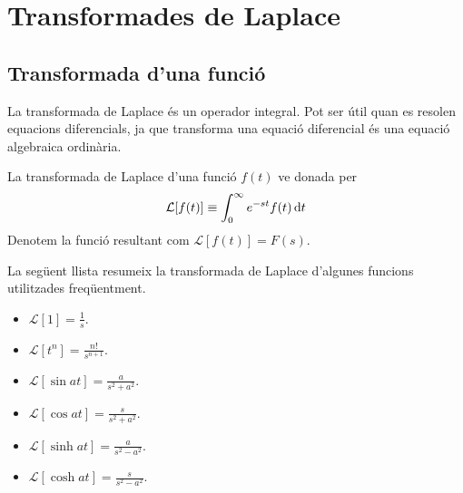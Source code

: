 \section{Transformades de Laplace}
\subsection{Transformada d'una funció}
La transformada de Laplace és un operador integral. Pot ser útil quan es resolen equacions diferencials, ja que transforma una equació diferencial és una equació algebraica ordinària.
\begin{defi}
    La transformada de Laplace d'una funció $f(t)$ ve donada per
    \begin{align}
        \mathcal{L}[f(t)] \equiv \int_{0}^{\infty} e^{-st} f(t) \mathop{}\!\mathrm{d} t
    \end{align}
    Denotem la funció resultant com $\mathcal{L}[f(t)] = F(s)$.
\end{defi}
La següent llista resumeix la transformada de Laplace d'algunes funcions utilitzades freqüentment.
\begin{itemize}
    \item $\mathcal{L}[1] = \displaystyle \frac{1}{s}$.
    \item $\mathcal{L}[t^{n}] = \displaystyle \frac{n!}{s^{n+1}}$.
    \item $\mathcal{L}[\sin at] = \displaystyle \frac{a}{s^2 + a^2}$.
    \item $\mathcal{L}[\cos at] = \displaystyle \frac{s}{s^2 + a^2}$.
    \item $\mathcal{L}[\sinh at] = \displaystyle \frac{a}{s^2 - a^2}$.
    \item $\mathcal{L}[\cosh at] = \displaystyle \frac{s}{s^2 - a^2}$.
\end{itemize}

